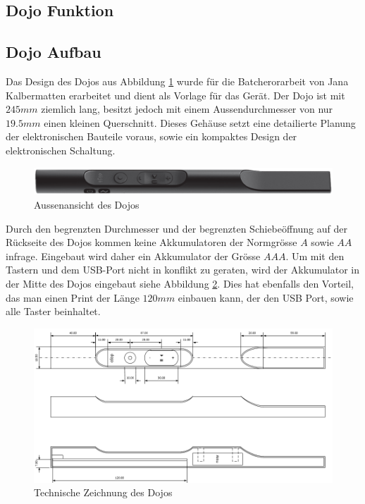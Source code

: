 \subsection{Dojo Funktion}


\subsection{Dojo Aufbau}
Das Design des Dojos aus Abbildung \ref{fig:DojoBild} wurde für die Batcherorarbeit von Jana Kalbermatten erarbeitet und dient als Vorlage für das Gerät. Der Dojo ist mit $245mm$ ziemlich lang, besitzt jedoch mit einem Aussendurchmesser von nur $19.5mm$ einen kleinen Querschnitt. Dieses Gehäuse setzt eine detailierte Planung der elektronischen Bauteile voraus, sowie ein kompaktes Design der elektronischen Schaltung.


\begin{figure}[h]
	\centering
	\includegraphics[width=\textwidth]{graphics/DojoBild.png}
	\caption{Aussenansicht des Dojos}
	\label{fig:DojoBild}
\end{figure}

Durch den begrenzten Durchmesser und der begrenzten Schiebeöffnung auf der Rückseite des Dojos kommen keine Akkumulatoren der Normgrösse $A$ sowie $AA$ infrage. Eingebaut wird daher ein Akkumulator der Grösse $AAA$. Um mit den Tastern und dem USB-Port nicht in konflikt zu geraten, wird der Akkumulator in der Mitte des Dojos eingebaut siehe Abbildung \ref{fig:DojoQuerschnitt}. Dies hat ebenfalls den Vorteil, das man einen Print der Länge $120mm$ einbauen kann, der den USB Port, sowie alle Taster beinhaltet.

\begin{figure}[h]
	\centering
	\includegraphics[width=\textwidth]{graphics/DojoQuerschnitt.png}
	\caption{Technische Zeichnung des Dojos}
	\label{fig:DojoQuerschnitt}
\end{figure}